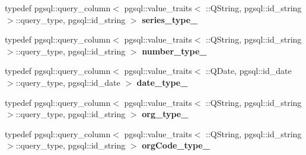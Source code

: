 \begin{DoxyCompactItemize}
\item 
typedef pgsql\+::query\+\_\+column$<$ pgsql\+::value\+\_\+traits$<$ \+::Q\+String, pgsql\+::id\+\_\+string $>$\+::query\+\_\+type, pgsql\+::id\+\_\+string $>$ {\bfseries series\+\_\+type\+\_\+}\hypertarget{structodb_1_1query__columns_3_01_1_1kpk_1_1data_1_1_person_00_01id__pgsql_00_01_a_01_4_1_1passport__class___afd41e368c6b9e72f609cef36a2e905dd}{}\label{structodb_1_1query__columns_3_01_1_1kpk_1_1data_1_1_person_00_01id__pgsql_00_01_a_01_4_1_1passport__class___afd41e368c6b9e72f609cef36a2e905dd}

\item 
typedef pgsql\+::query\+\_\+column$<$ pgsql\+::value\+\_\+traits$<$ \+::Q\+String, pgsql\+::id\+\_\+string $>$\+::query\+\_\+type, pgsql\+::id\+\_\+string $>$ {\bfseries number\+\_\+type\+\_\+}\hypertarget{structodb_1_1query__columns_3_01_1_1kpk_1_1data_1_1_person_00_01id__pgsql_00_01_a_01_4_1_1passport__class___a29df0b9e75a5ac15f550561c179b6329}{}\label{structodb_1_1query__columns_3_01_1_1kpk_1_1data_1_1_person_00_01id__pgsql_00_01_a_01_4_1_1passport__class___a29df0b9e75a5ac15f550561c179b6329}

\item 
typedef pgsql\+::query\+\_\+column$<$ pgsql\+::value\+\_\+traits$<$ \+::Q\+Date, pgsql\+::id\+\_\+date $>$\+::query\+\_\+type, pgsql\+::id\+\_\+date $>$ {\bfseries date\+\_\+type\+\_\+}\hypertarget{structodb_1_1query__columns_3_01_1_1kpk_1_1data_1_1_person_00_01id__pgsql_00_01_a_01_4_1_1passport__class___a3bc9eac14ecf5653f6378f1140cd4f8d}{}\label{structodb_1_1query__columns_3_01_1_1kpk_1_1data_1_1_person_00_01id__pgsql_00_01_a_01_4_1_1passport__class___a3bc9eac14ecf5653f6378f1140cd4f8d}

\item 
typedef pgsql\+::query\+\_\+column$<$ pgsql\+::value\+\_\+traits$<$ \+::Q\+String, pgsql\+::id\+\_\+string $>$\+::query\+\_\+type, pgsql\+::id\+\_\+string $>$ {\bfseries org\+\_\+type\+\_\+}\hypertarget{structodb_1_1query__columns_3_01_1_1kpk_1_1data_1_1_person_00_01id__pgsql_00_01_a_01_4_1_1passport__class___a64e353f93c2fcd0ecd4f22154d91732c}{}\label{structodb_1_1query__columns_3_01_1_1kpk_1_1data_1_1_person_00_01id__pgsql_00_01_a_01_4_1_1passport__class___a64e353f93c2fcd0ecd4f22154d91732c}

\item 
typedef pgsql\+::query\+\_\+column$<$ pgsql\+::value\+\_\+traits$<$ \+::Q\+String, pgsql\+::id\+\_\+string $>$\+::query\+\_\+type, pgsql\+::id\+\_\+string $>$ {\bfseries org\+Code\+\_\+type\+\_\+}\hypertarget{structodb_1_1query__columns_3_01_1_1kpk_1_1data_1_1_person_00_01id__pgsql_00_01_a_01_4_1_1passport__class___aae9f653465b19d310c7b7dcc44e2b1e0}{}\label{structodb_1_1query__columns_3_01_1_1kpk_1_1data_1_1_person_00_01id__pgsql_00_01_a_01_4_1_1passport__class___aae9f653465b19d310c7b7dcc44e2b1e0}

\end{DoxyCompactItemize}
